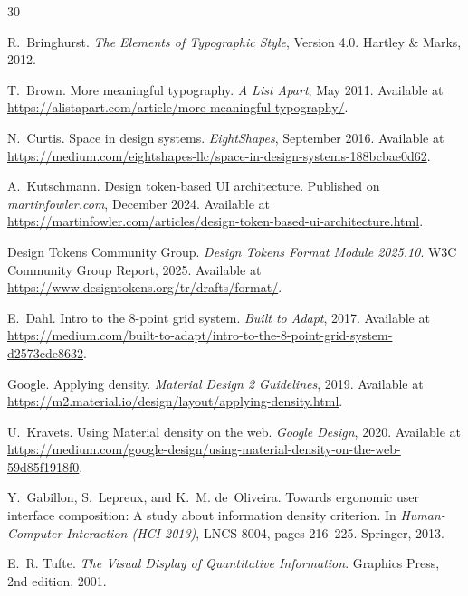 \begin{thebibliography}{30}


R.~Bringhurst.
\newblock \emph{The Elements of Typographic Style}, Version 4.0.
\newblock Hartley \& Marks, 2012.

T.~Brown.
\newblock More meaningful typography.
\newblock \emph{A List Apart}, May 2011.
\newblock Available at \url{https://alistapart.com/article/more-meaningful-typography/}.

N.~Curtis.
\newblock Space in design systems.
\newblock \emph{EightShapes}, September 2016.
\newblock Available at \url{https://medium.com/eightshapes-llc/space-in-design-systems-188bcbae0d62}.

A.~Kutschmann.
\newblock Design token-based UI architecture.
\newblock Published on \emph{martinfowler.com}, December 2024.
\newblock Available at \url{https://martinfowler.com/articles/design-token-based-ui-architecture.html}.

Design Tokens Community Group.
\newblock \emph{Design Tokens Format Module 2025.10}.
\newblock W3C Community Group Report, 2025.
\newblock Available at \url{https://www.designtokens.org/tr/drafts/format/}.

E.~Dahl.
\newblock Intro to the 8-point grid system.
\newblock \emph{Built to Adapt}, 2017.
\newblock Available at \url{https://medium.com/built-to-adapt/intro-to-the-8-point-grid-system-d2573cde8632}.


Google.
\newblock Applying density.
\newblock \emph{Material Design 2 Guidelines}, 2019.
\newblock Available at \url{https://m2.material.io/design/layout/applying-density.html}.

U.~Kravets.
\newblock Using Material density on the web.
\newblock \emph{Google Design}, 2020.
\newblock Available at \url{https://medium.com/google-design/using-material-density-on-the-web-59d85f1918f0}.

Y.~Gabillon, S.~Lepreux, and K.~M. de~Oliveira.
\newblock Towards ergonomic user interface composition: A study about
  information density criterion.
\newblock In \emph{Human-Computer Interaction (HCI 2013)}, LNCS 8004,
  pages 216--225. Springer, 2013.

E.~R. Tufte.
\newblock \emph{The Visual Display of Quantitative Information}.
\newblock Graphics Press, 2nd edition, 2001.


\end{thebibliography}
